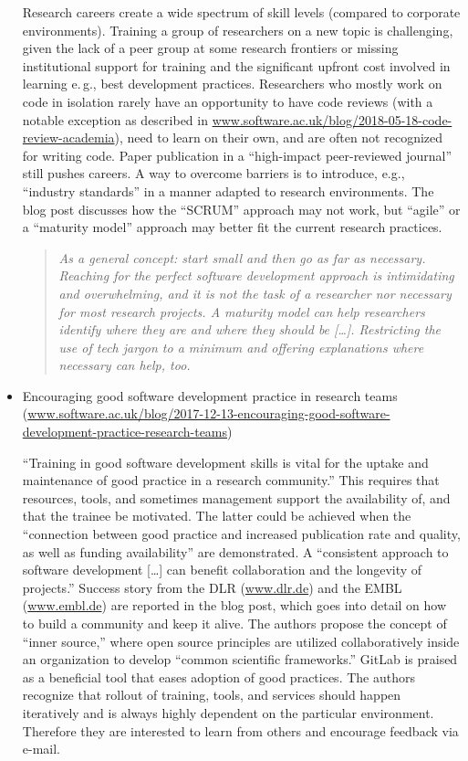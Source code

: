 \documentclass[11pt,letterpaper]{article}
\begin{document}
\begin{itemize}
\noindent Research careers create a wide spectrum of skill levels (compared to corporate environments). Training a group of researchers on a new topic is challenging, given the lack of a peer group at some research frontiers or missing institutional support for training and the significant upfront cost involved in learning e.\,g., best development practices. Researchers who mostly work on code in isolation rarely have an opportunity to have code reviews (with a notable exception as described in \href{https://www.software.ac.uk/blog/2018-05-18-code-review-academia}{www.software.ac.uk/blog/2018-05-18-code-review-academia}), need to learn on their own, and are often not recognized for writing code. Paper publication in a ``high-impact peer-reviewed journal'' still pushes careers. A way to overcome barriers is to introduce, e.g., ``industry standards'' in a manner adapted to research environments. The blog post discusses how the ``SCRUM'' approach may not work, but ``agile'' or a ``maturity model'' approach may better fit the current research practices.
\begin{quote}\textit{
As a general concept: start small and then go as far as necessary. Reaching for the perfect software development approach is intimidating and overwhelming, and it is not the task of a researcher nor necessary for most research projects. A maturity model can help researchers identify where they are and where they should be [\ldots]. Restricting the use of tech jargon to a minimum and offering explanations where necessary can help, too.}
\end{quote}


\item Encouraging good software development practice in research teams (\href{https://www.software.ac.uk/blog/2017-12-13-encouraging-good-software-development-practice-research-teams}{www.software.ac.uk/blog/2017-12-13-encouraging-good-software-development-practice-research-teams})

\noindent ``Training in good software development skills is vital for the uptake and maintenance of good practice in a research community.'' This requires that resources, tools, and sometimes management support the availability of, and that the trainee be motivated. The latter could be achieved when the ``connection between good practice and increased publication rate and quality, as well as funding availability'' are demonstrated. A ``consistent approach to software development [\ldots] can benefit collaboration and the longevity of projects.'' Success story from the DLR (\href{https://www.dlr.de}{www.dlr.de}) and the EMBL (\href{https://www.embl.de/}{www.embl.de}) are reported in the blog post, which goes into detail on how to build a community and keep it alive. The authors propose the concept of ``inner source,'' where open source principles are utilized collaboratively inside an organization to develop ``common scientific frameworks.'' GitLab is praised as a beneficial tool that eases adoption of good practices. The authors recognize that rollout of training, tools, and services should happen iteratively and is always highly dependent on the particular environment. Therefore they are interested to learn from others and encourage feedback via e-mail.


\end{itemize}
\end{document}
